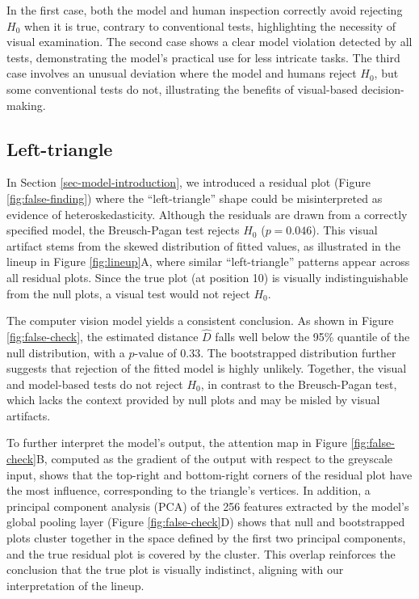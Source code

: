 \documentclass[]{interact}
\theoremstyle{plain}%
\theoremstyle{definition}
\theoremstyle{remark}
\begin{document}
In the first case, both the model and human inspection correctly avoid
rejecting \(H_0\) when it is true, contrary to conventional tests,
highlighting the necessity of visual examination. The second case shows
a clear model violation detected by all tests, demonstrating the model's
practical use for less intricate tasks. The third case involves an
unusual deviation where the model and humans reject \(H_0\), but some
conventional tests do not, illustrating the benefits of visual-based
decision-making.

\subsection{Left-triangle}\label{left-triangle}

In Section \ref{sec-model-introduction}, we introduced a residual plot
(Figure \ref{fig:false-finding}) where the ``left-triangle'' shape could
be misinterpreted as evidence of heteroskedasticity. Although the
residuals are drawn from a correctly specified model, the Breusch-Pagan
test rejects \(H_0\) (\(p = 0.046\)). This visual artifact stems from
the skewed distribution of fitted values, as illustrated in the lineup
in Figure \ref{fig:lineup}A, where similar ``left-triangle'' patterns
appear across all residual plots. Since the true plot (at position 10)
is visually indistinguishable from the null plots, a visual test would
not reject \(H_0\).

The computer vision model yields a consistent conclusion. As shown in
Figure \ref{fig:false-check}, the estimated distance \(\hat{D}\) falls
well below the 95\% quantile of the null distribution, with a
\(p\)-value of \(0.33\). The bootstrapped distribution further suggests
that rejection of the fitted model is highly unlikely. Together, the
visual and model-based tests do not reject \(H_0\), in contrast to the
Breusch-Pagan test, which lacks the context provided by null plots and
may be misled by visual artifacts.

To further interpret the model's output, the attention map in Figure
\ref{fig:false-check}B, computed as the gradient of the output with
respect to the greyscale input, shows that the top-right and
bottom-right corners of the residual plot have the most influence,
corresponding to the triangle's vertices. In addition, a principal
component analysis (PCA) of the 256 features extracted by the model's
global pooling layer (Figure \ref{fig:false-check}D) shows that null and
bootstrapped plots cluster together in the space defined by the first
two principal components, and the true residual plot is covered by the
cluster. This overlap reinforces the conclusion that the true plot is
visually indistinct, aligning with our interpretation of the lineup.
\end{document}
